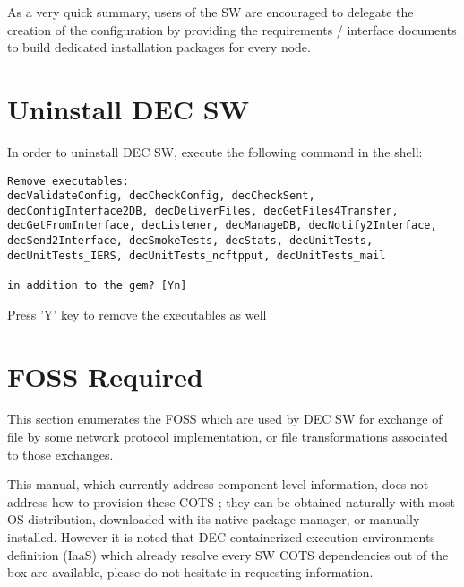 \documentclass[dec_sum_main.tex]{subfiles}
\begin{document}
 \newline

\noindent
As a very quick summary, users of the SW are encouraged to delegate the creation of the configuration by providing the requirements / interface documents to build dedicated installation packages for every node. 
\par


\section{Uninstall DEC SW}

In order to uninstall DEC SW, execute the following command in the shell:
\par 
{}
\par 

\begin{verbatim}
Remove executables:
decValidateConfig, decCheckConfig, decCheckSent, decConfigInterface2DB, decDeliverFiles, decGetFiles4Transfer, decGetFromInterface, decListener, decManageDB, decNotify2Interface, decSend2Interface, decSmokeTests, decStats, decUnitTests, decUnitTests_IERS, decUnitTests_ncftpput, decUnitTests_mail

in addition to the gem? [Yn]
\end{verbatim}

Press 'Y' key to remove the executables as well

\label{COTS}
\label{FOSS}
\section{FOSS Required}

This section enumerates the FOSS which are used by DEC SW for exchange of file by some network protocol implementation, or file transformations associated to those exchanges. \par\noindent


\par
\noindent
This manual, which currently address component level information, does not address how to provision these COTS ; they can be obtained naturally with most OS distribution, downloaded with its native package manager, or manually installed. However it is noted that DEC containerized execution environments definition (IaaS) which already resolve every SW COTS dependencies out of the box are available, please do not hesitate in requesting information.
\end{document}
